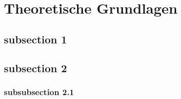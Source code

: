 \section{Theoretische Grundlagen}

\subsection{subsection 1}

\subsection{subsection 2}

\subsubsection{subsubsection 2.1}

\iffalse
Hey, I'm a block comment!
\fi
